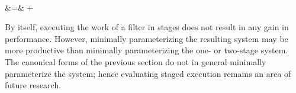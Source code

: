  \\
 &\hspace{-6pt}=\hspace{-6pt}& 
 +  
\doneeqnstar

By itself, executing the work of a filter in stages does not result in
any gain in performance. However, minimally parameterizing the
resulting system may be more productive than minimally parameterizing
the one- or two-stage system.  The canonical forms of the previous
section do not in general minimally parameterize the system; hence
evaluating staged execution remains an area of future research.
